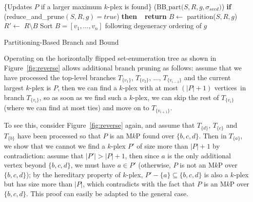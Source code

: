 \documentclass[sigconf, nonacm]{acmart}
\begin{document}
\begin{algorithm}[!t]
  \DontPrintSemicolon
  \{Updates $P$ if a larger maximum $k$-plex is found\}\;
  \Begin($\text{BB\_part}{(}S, R, g, \sigma_{seed}{)}$){
    {\bf if} (reduce\_and\_prune$(S, R, g)=\textit{true}$) {\bf then\ \ return}\;
    $B\gets$ partition($S, R, g$)\;\label{bbpart:partition}
    $R'\gets$ $R\setminus B$\;\label{bbpart:r-prime}
    Sort $B=[v_1,\dots, v_n]$ following degeneracy ordering of $g$\;
  }
  \caption{Partitioning-Based Branch and Bound}    
  \label{algo:bbpart}
\end{algorithm}

\vspace{1mm}
 Operating on the horizontally flipped set-enumeration tree as shown in Figure~\ref{fig:reverse} allows additional branch pruning as follows: assume that we have processed the top-level branches $T_{\{v_1\}}$,  $T_{\{v_2\}}$, $\ldots$, $T_{\{v_{i-1}\}}$ and the current largest $k$-plex is $P$, then we can find a $k$-plex with at most $(|P|+1)$ vertices~in %
branch $T_{\{v_{i}\}}$, so as soon as we find such a $k$-plex, we can skip the rest of $T_{\{v_{i}\}}$ (where we can find at most ties) and move on to $T_{\{v_{i+1}\}}$.

To see this, consider Figure~\ref{fig:reverse} again, and assume that  $T_{\{d\}}$,  $T_{\{c\}}$ and  $T_{\{b\}}$ have been processed so that $P$ is an M$k$P found over $\{b, c, d\}$. Then in $T_{\{a\}}$, we show that we cannot we find a $k$-plex $P'$ of size more than $|P|+1$ by contradiction: assume that  $|P'|>|P|+1$, then since $a$ is the only additional vertex beyond $\{b, c, d\}$, we must have $a\in P'$ (otherwise, $P$ is not an M$k$P over $\{b, c, d\}$); by the hereditary property of $k$-plex, $P'-\{a\}\subseteq \{b, c, d\}$ is also a $k$-plex but has size more than $|P|$, which contradicts with the fact that $P$ is an M$k$P over $\{b, c, d\}$. This proof can easily be adapted to the general case.
\end{document}
